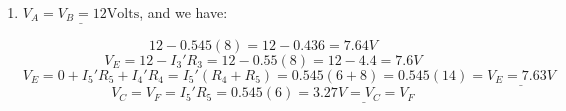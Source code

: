 {\begin{enumerate}
	Note \underline{$I_2'=I_1'=0$} and \underline{$I_5'=I_3'=I_4'$}
	\vspace{5mm}
	
	Hence:
	$$12V=I_5'(R_3+R_4+R_5)=I_5'(8+8+6)=22I_5'$$
	$$\underline{I_5'=\frac{12}{22}A=0.545A}$$
	
	
	\item $\underline{V_A=V_B=12\textrm{Volts}}$, and we have:
	
	$$12-0.545(8)=12-0.436=7.64V$$
	$$V_E=12-I_3'R_3=12-0.55(8)=12-4.4=7.6V$$
	$$V_E=0+I_5'R_5+I_4'R_4=I_5'(R_4+R_5)=0.545(6+8)=0.545(14)=\underline{V_E=7.63V}$$
	$$V_C=V_F=I_5'R_5=0.545(6)=\underline{3.27V=V_C=V_F}$$
\end{enumerate}
}{}